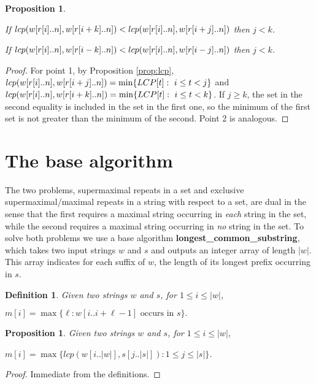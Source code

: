 \documentclass[submission]{dmtcs}
\newcommand\+[1]{\mathcal{#1}}
\newtheorem{definition}[theorem]{Definition}
\newtheorem{proposition}[theorem]{Proposition}
\newenvironment{my_enumerate}{\begin{enumerate}
  \setlength{\itemsep}{1pt}
  \setlength{\parskip}{0pt}
  \setlength{\parsep}{0pt}}{\end{enumerate}}
\begin{document}
\begin{proposition}\label{prop:lcpyr} \ 
\begin{my_enumerate}
\item If $lcp(w[r[i]..n], w[r[i+k]..n]) <  lcp(w[r[i]..n], w[r[i+j]..n])$
then $j<k$.
\item If $lcp(w[r[i]..n], w[r[i-k]..n]) <  lcp(w[r[i]..n], w[r[i-j]..n])$
then $j<k$.
\end{my_enumerate}
\end{proposition}
\begin{proof}
For point 1, by Proposition \ref{prop:lcp}, 
$lcp(w[r[i]..n], w[r[i+j]..n]) = \min \{ LCP[t] : \ i \leq t < j \}$ and
$lcp(w[r[i]..n], w[r[i+k]..n]) = \min \{ LCP[t] : \ i \leq t < k \}$. If 
$j \geq k$,  the set in the second equality is included 
in the set in the  first one, so 
the minimum of the first set is not greater than the minimum of the second.
Point 2 is analogous.
\end{proof}



\section{The base algorithm}


The two problems,  supermaximal repeats in a set and 
exclusive supermaximal/maximal repeats in a string with respect to a set,
are dual in the sense that the first requires a 
maximal string occurring in {\em each} string in the set, 
while the second requires a maximal string 
occurring  in {\em no} string in the set.
To solve both problems we use a base algorithm
{\bf longest\_common\_substring}, 
which takes two input strings $w$ and $s$
and outputs an integer array of length $|w|$. 
This array indicates for each suffix of $w$,
the length of its longest prefix occurring in $s$.

\begin{definition}\label{def:m}
Given two strings $w$ and $s$, 
for $1\leq i\leq |w|$, 

\centerline{$m[i]=\max \{\ell : w[i..i+\ell-1] \text{ occurs in } s\}.$}
\end{definition}

\begin{proposition}\label{prop:defm}
Given two strings $w$ and $s$, for $1\leq i\leq |w|$, 

\centerline{$m[i]=\max \{lcp(w[i..|w|], s[j..|s|]) : 1\leq j\leq |s|\}$.}
\end{proposition}
\begin{proof}
Immediate from the definitions.
\end{proof}
\end{document}
